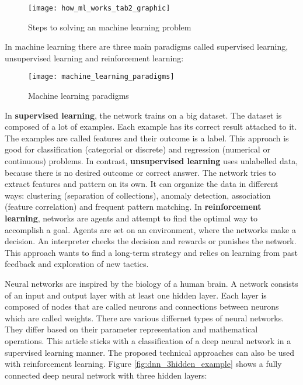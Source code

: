 \begin{figure}[H]
    \centering
    \texttt{[image: how\_ml\_works\_tab2\_graphic]}
    \caption{\cite{tf_ml_steps_pipline} Steps to solving an machine learning problem}
    \label{fig:ml_steps_pipeline}
\end{figure}

In machine learning there are three main paradigms called supervised learning, unsupervised learning and reinforcement learning:

\begin{figure}[H]
    \centering
    \texttt{[image: machine\_learning\_paradigms]}
    \caption{\cite{ml_paradigms_image} Machine learning paradigms}
    \label{fig:ml_paradigms_image}
\end{figure}

In \textbf{supervised learning}, the network trains on a big dataset.
The dataset is composed of a lot of examples.
Each example has its correct result attached to it.
The examples are called features and their outcome is a label.
This approach is good for classification (categorial or discrete) and regression (numerical or continuous) problems.
\cite{nvidia_paradigms_blog}
\hfill \break
In contrast, \textbf{unsupervised learning} uses unlabelled data, because there is no desired outcome or correct answer.
The network tries to extract features and pattern on its own.
It can organize the data in different ways: clustering (separation of collections), anomaly detection, association
(feature correlation) and frequent pattern matching.
\cite{nvidia_paradigms_blog}
\hfill \break
In \textbf{reinforcement learning}, networks are agents and attempt to find the optimal way to accomplish a goal.
Agents are set on an environment, where the networks make a decision.
An interpreter checks the decision and rewards or punishes the network.
This approach wants to find a long-term strategy and relies on learning from past feedback and exploration of new tactics.
\cite{nvidia_paradigms_blog}

Neural networks are inspired by the biology of a human brain.
A network consists of an input and output layer with at least one hidden layer.
Each layer is composed of nodes that are called neurons and connections between neurons which are called weights.
There are various differnet types of neural networks.
They differ based on their parameter representation and mathematical operations.
This article sticks with a classification of a deep neural network in a supervised learning manner.
The proposed technical approaches can also be used with reinforcement learning.
Figure \ref{fig:dnn_3hidden_example} shows a fully connected deep neural network with three hidden layers:
\cite{nvidia-ai-explained, tensorflow-about}

